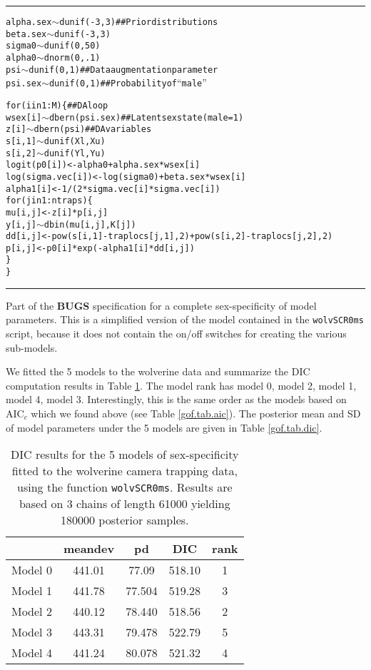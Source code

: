 \begin{panel}[tp]
\centering
\rule[0.15in]{\textwidth}{.03in}
{\small
\begin{alltt}
alpha.sex \(\sim\) dunif(-3,3)            ## Prior distributions 
beta.sex  \(\sim\) dunif(-3,3)
sigma0 \(\sim\) dunif(0,50)
alpha0 \(\sim\) dnorm(0,.1)
psi \(\sim\) dunif(0,1)                   ## Data augmentation parameter
psi.sex  \(\sim\) dunif(0,1)              ## Probability of ``male''

for(i in 1:M)\{                      ## DA loop
  wsex[i] \(\sim\) dbern(psi.sex)         ## Latent sex state (male = 1)
  z[i] \(\sim\) dbern(psi)                ## DA variables
  s[i,1] \(\sim\) dunif(Xl,Xu)
  s[i,2] \(\sim\) dunif(Yl,Yu)
  logit(p0[i]) <- alpha0 + alpha.sex*wsex[i]
  log(sigma.vec[i]) <- log(sigma0) + beta.sex*wsex[i]
  alpha1[i] <- 1/(2*sigma.vec[i]*sigma.vec[i])
  for(j in 1:ntraps)\{
    mu[i,j] <- z[i]*p[i,j]
    y[i,j] \(\sim\) dbin(mu[i,j],K[j])
    dd[i,j] <- pow(s[i,1] - traplocs[j,1],2)  + pow(s[i,2] - traplocs[j,2],2)
    p[i,j]  <-  p0[i]*exp( - alpha1[i]*dd[i,j] )
   \}
 \}
\end{alltt}
}
\rule[-0.15in]{\textwidth}{.03in}
\caption{
Part of the {\bf BUGS} specification for a complete sex-specificity of model
parameters. This is a simplified version of the model contained in the 
\mbox{\tt wolvSCR0ms} script, because it does not contain the on/off
switches for creating the various sub-models. 
}
\label{gof.panel.sexmodel}
\end{panel}


We fitted the 5 models to the wolverine data and summarize
the DIC computation results in Table \ref{gof.tab.DIC}. 
The model rank has model 0, model 2, model 1, model 4, model 3.
Interestingly, this is the same order as the models based on AIC$_c$
which we found above
(see Table \ref{gof.tab.aic}).
The posterior mean and SD of model parameters under the 5 models are
given in Table \ref{gof.tab.dic}. 

\begin{table}[ht]
\centering
\caption{
DIC results for the 5 models of sex-specificity fitted to the
wolverine camera trapping data, using the function
\mbox{\tt wolvSCR0ms}. Results are based on 3 chains of length 61000
yielding 180000 posterior samples. 
}
\begin{tabular}{ccccc} \hline \hline
      &  meandev  &  pd   &    DIC  &   rank \\ \hline
Model 0&  441.01 & 77.09&518.10&    1 \\
Model 1& 441.78 &77.504 &519.28&    3\\
Model 2& 440.12 &78.440 &518.56&    2\\
Model 3& 443.31 &79.478 &522.79&    5\\
Model 4& 441.24 &80.078 &521.32&    4\\
\end{tabular}
\label{gof.tab.DIC}
\end{table}

